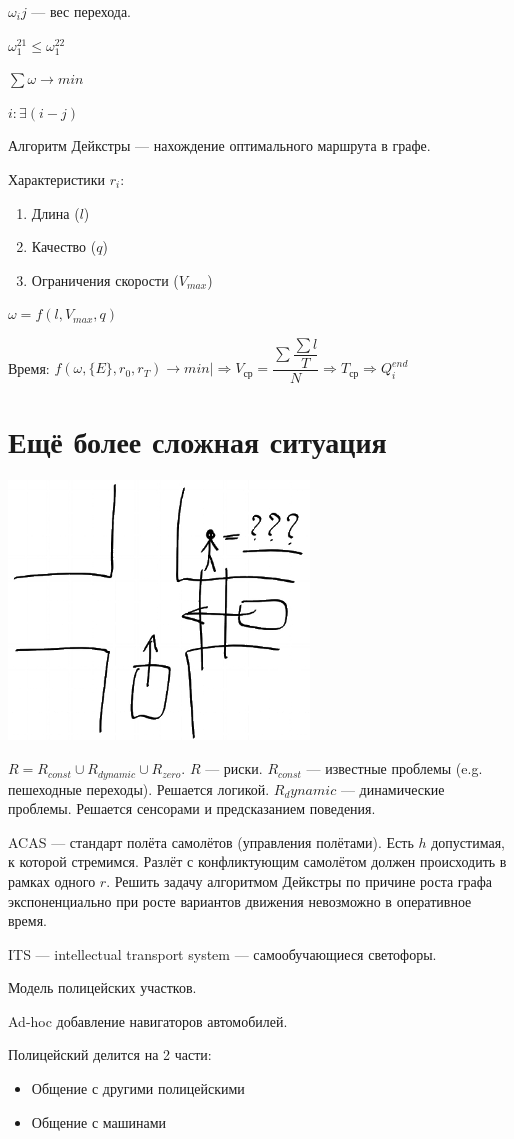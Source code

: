 \documentclass{article}
\begin{document}
$\omega_ij$ — вес перехода.

$\omega_1^{21} \leq \omega_1^{22}$

$\sum \omega \rightarrow min$

$i : \exists(i - j)$

Алгоритм Дейкстры — нахождение оптимального маршрута в графе.

Характеристики $r_i$:
\begin{enumerate}
    \item Длина ($l$)
    \item Качество ($q$)
    \item Ограничения скорости ($V_{max}$)
\end{enumerate}

$\omega = f(l, V_{max}, q)$

Время: $\left.f(\omega, \{E\}, r_0, r_T) \rightarrow min\right|\Rightarrow V_{\text{ср}} = \dfrac{\sum \dfrac{\sum l}{T}}{N} \Rightarrow T_\text{ср} \Rightarrow Q_i^{end}$

\section*{Ещё более сложная ситуация}

\includegraphics[width=0.6\textwidth]{graphics/pic09.png}

$R = R_{const} \cup R_{dynamic} \cup R_{zero}$. $R$ — риски. $R_{const}$ — известные проблемы (e.g. пешеходные переходы). Решается логикой. $R_dynamic$ — динамические проблемы. Решается сенсорами и предсказанием поведения.

ACAS — стандарт полёта самолётов (управления полётами). Есть $h$ допустимая, к которой стремимся. Разлёт с конфликтующим самолётом должен происходить в рамках одного $r$. Решить задачу алгоритмом Дейкстры по причине роста графа экспоненциально при росте вариантов движения невозможно в оперативное время.

ITS — intellectual transport system — самообучающиеся светофоры.

Модель полицейских участков.

Ad-hoc добавление навигаторов автомобилей.

Полицейский делится на 2 части:
\begin{itemize}
    \item Общение с другими полицейскими
    \item Общение с машинами
\end{itemize}
\end{document}
